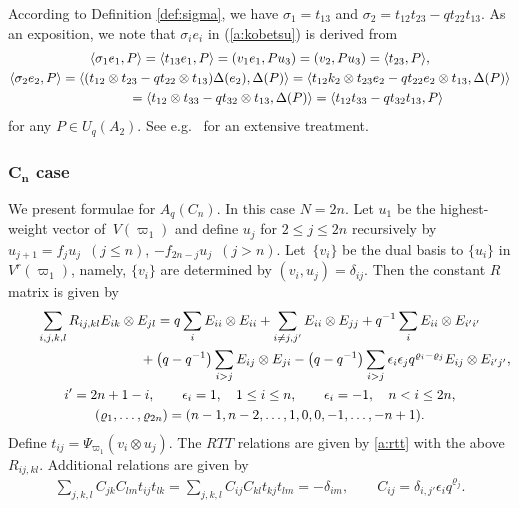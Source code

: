 According to Def\/inition \ref{def:sigma}, we have
$\sigma_1 = t_{13}$ and $\sigma_2 = t_{12}t_{23}-qt_{22}t_{13}$.
As an exposition,  we note that
$\sigma_i e_i$ in (\ref{a:kobetsu}) is  derived from
\begin{gather*}
\langle \sigma_1e_1, P\rangle  =\langle t_{13}e_1, P\rangle
= (v_1e_1, Pu_3) = (v_2, Pu_3) = \langle t_{23}, P \rangle,\\
\langle \sigma_2e_2, P\rangle
= \langle (t_{12}\otimes t_{23}-qt_{22}\otimes t_{13})\Delta(e_2), \Delta(P)\rangle
=\langle t_{12}k_2 \otimes t_{23}e_2- q t_{22}e_2\otimes t_{13}, \Delta(P)\rangle\\
\hphantom{\langle \sigma_2e_2, P\rangle}{}
= \langle t_{12} \otimes t_{33}- q t_{32}\otimes t_{13}, \Delta(P)\rangle
= \langle t_{12}t_{33}- q t_{32} t_{13}, P\rangle
\end{gather*}
for any $P \in U_q(A_2)$.
See e.g.~\cite{NYM} for an extensive treatment.

\subsubsection[$C_n$ case]{$\boldsymbol{C_n}$ case}\label{a:sss:c1}

We present formulae for $A_q(C_n)$. In this case $N=2n$.
Let $u_1$ be the highest-weight vector of~$V(\varpi_1)$ and
def\/ine $u_j$ for $2\le j\le 2n$ recursively by $u_{j+1}=f_ju_j$~$(j\le n)$, $-f_{2n-j}u_j$~$(j>n)$.
Let~$\{v_i\}$ be the dual basis to $\{u_i\}$ in $V^r(\varpi_1)$,
namely, $\{v_i\}$ are determined
by $(v_i,u_j)=\delta_{ij}$. Then the constant $R$ matrix is given by
\begin{gather*}
 \sum_{i,j,k,l}R_{ij,kl}E_{ik}\otimes E_{jl}=
q\sum_i E_{ii}\otimes E_{ii} + \sum_{i\neq j, j'}E_{ii}\otimes E_{jj}
+q^{-1}\sum_i E_{ii}\otimes E_{i'i'}\\
\hphantom{\sum_{i,j,k,l}R_{ij,kl}E_{ik}\otimes E_{jl}=}{}
+\big(q-q^{-1}\big)\sum_{i>j}E_{ij}\otimes E_{ji}
-\big(q-q^{-1}\big)\sum_{i>j}\epsilon_i\epsilon_jq^{\varrho_i-\varrho_j}E_{ij}\otimes E_{i'j'},\\
i' = 2n+1-i,
\qquad
\epsilon_i = 1, \quad 1\le i \le n,\qquad \epsilon_i = -1, \quad n<i \le 2n,\\
(\varrho_1,\ldots, \varrho_{2n}) = (n-1,n-2,\ldots,1,0,0,-1,\ldots, -n+1).
\end{gather*}
Def\/ine $t_{ij}=\Psi_{\varpi_1}(v_i \otimes u_j)$. The $RTT$ relations are given by \eqref{a:rtt}
with the above $R_{ij,kl}$. Additional relations are given by
\begin{gather*}
 \sum_{j,k,l}C_{jk}C_{lm}t_{ij}t_{lk}
= \sum_{j,k,l}C_{ij}C_{kl}t_{kj}t_{lm} = -\delta_{im},
\qquad  C_{ij}= \delta_{i,j'}\epsilon_i q^{\varrho_j}.
\end{gather*}

